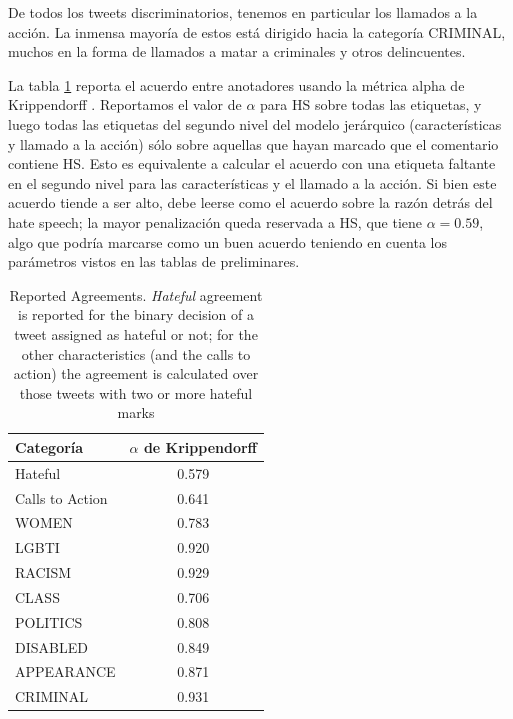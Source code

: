 De todos los tweets discriminatorios, tenemos en particular los llamados a la acción. La inmensa mayoría de estos está dirigido hacia la categoría CRIMINAL, muchos en la forma de llamados a matar a criminales y otros delincuentes.

La tabla \ref{tab:annotation_agreement} reporta el acuerdo entre anotadores usando la métrica alpha de Krippendorff . Reportamos el valor de $\alpha$ para HS sobre todas las etiquetas, y luego todas las etiquetas del segundo nivel del modelo jerárquico (características y llamado a la acción) sólo sobre aquellas que hayan marcado que el comentario contiene HS. Esto es equivalente a calcular el acuerdo con una etiqueta faltante en el segundo nivel para las características y el llamado a la acción. Si bien este acuerdo tiende a ser alto, debe leerse como el acuerdo sobre la razón detrás del hate speech; la mayor penalización queda reservada a HS, que tiene $\alpha = 0.59$, algo que podría marcarse como un buen acuerdo teniendo en cuenta los parámetros vistos en las tablas de preliminares. 

\begin{table}
    \centering
    \begin{tabular}{lc}
        \toprule
        Categoría   & $\alpha$ de Krippendorff \\
        \midrule
        Hateful              &  0.579 \\
        Calls to Action      &  0.641 \\
        \midrule
        WOMEN                &  0.783 \\
        LGBTI                &  0.920 \\
        RACISM               &  0.929 \\
        CLASS                &  0.706 \\
        POLITICS             &  0.808 \\
        DISABLED             &  0.849 \\
        APPEARANCE           &  0.871 \\
        CRIMINAL             &  0.931 \\
        \bottomrule
    \end{tabular}
    \caption{Reported Agreements. \emph{Hateful} agreement is reported for the binary decision of a tweet assigned as hateful or not; for the other characteristics (and the calls to action) the agreement is calculated over those tweets with two or more hateful marks}
    \label{tab:annotation_agreement}
\end{table}




